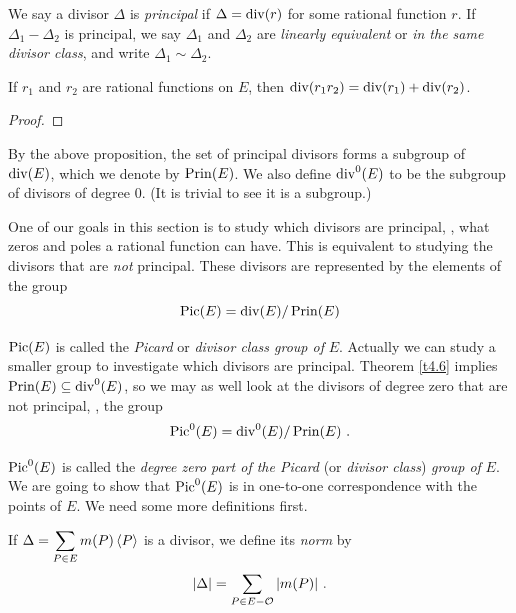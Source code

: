 \begin{defi}
\label{d5.6}
We say a divisor $\Delta$ is {\it principal} if $\Delta=\operatorname{div}(r)$ for some rational function $r$. If $\Delta_{1}-\Delta_{2}$ is principal, we say $\Delta_{1}$ and $\Delta_{2}$ are {\it linearly equivalent} or {\it in the same divisor class}, and write $\Delta_{1}\sim\Delta_{2}$.
\end{defi}

\begin{prop}
\label{p5.7}
If $r_{1}$ and $r_{2}$ are rational functions on $E$, then $\operatorname{div}(r_{1}r_{2})= \operatorname{div}(r_{1})+\operatorname{div}(r_{2})$.
\end{prop}

\begin{proof}
\iftoggle{modifiedversion}{%
Direct consequence of lemma \ref{lem:ord:add}.
}{
It is easy to see that $\forall \, P\,,\ \ord{P}(r_{1}r_{2})=\ord{P}(r_{1})+\ord{p}(r_{2})$, and the proposition follows from this.
}
\end{proof}

\begin{defi}
\label{d5.8}
By the above proposition, the set of principal divisors forms a subgroup of $\operatorname{div}(E)$, which we denote by $\operatorname{Prin}(E)$. We also define $\operatorname{div}^{0}(E)$ to be the subgroup of divisors of degree $0$. (It is trivial to see it is a subgroup.)
\end{defi}

One of our goals in this section is to study which divisors are principal, \ie, what zeros and poles a rational function can have. This is equivalent to studying the divisors that are {\it not} principal. These divisors are represented by the elements of the group
\[\operatorname{Pic}(E)=\operatorname{div}(E)/\operatorname{Prin}(E)\]

$\operatorname{Pic}(E)$ is called the {\it Picard} or {\it divisor class group of} $E$. Actually we can study a smaller group to investigate which divisors are principal. Theorem \ref{t4.6} implies $\operatorname{Prin}(E)\subseteq \operatorname{div}^{0}(E)$, so we may as well look at the divisors of degree zero that are not principal, \ie, the group
\[\on{Pic}^0(E)=\on{div}^{0}(E)/\on{Prin}(E)\ .\]

$\operatorname{Pic}^{0}(E)$ is called the {\it degree zero part of the Picard} (or {\it divisor class}) {\it group of} $E$. We are going to show that $\operatorname{Pic}^{0}(E)$ is in one-to-one correspondence with the points of $E$. We need some more definitions first.

\begin{defi}
\label{d5.9}
If $\displaystyle \Delta=\sum_{P\in E}m(P)\left\langle P \right \rangle$ is a divisor, we define its {\it norm} by
$$
|\Delta|=\sum_{P\in E-\mathcal{O}}|m(P)|\ .
$$
\end{defi}

